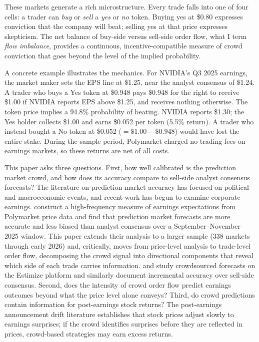 \documentclass[11pt]{article}
\begin{document}
These markets generate a rich microstructure. Every trade falls into one of four cells: a trader can \textit{buy} or \textit{sell} a \textit{yes} or \textit{no} token. Buying yes at \$0.80 expresses conviction that the company will beat; selling yes at that price expresses skepticism. The net balance of buy-side versus sell-side order flow, what I term \textit{flow imbalance}, provides a continuous, incentive-compatible measure of crowd conviction that goes beyond the level of the implied probability.

A concrete example illustrates the mechanics. For NVIDIA's Q3 2025 earnings, the market maker sets the EPS line at \$1.25, near the analyst consensus of \$1.24. A trader who buys a Yes token at \$0.948 pays \$0.948 for the right to receive \$1.00 if NVIDIA reports EPS above \$1.25, and receives nothing otherwise. The token price implies a 94.8\% probability of beating. NVIDIA reports \$1.30; the Yes holder collects \$1.00 and earns \$0.052 per token (5.5\% return). A trader who instead bought a No token at \$0.052 ($= \$1.00 - \$0.948$) would have lost the entire stake. During the sample period, Polymarket charged no trading fees on earnings markets, so these returns are net of all costs.

This paper asks three questions. First, how well calibrated is the prediction market crowd, and how does its accuracy compare to sell-side analyst consensus forecasts? The literature on prediction market accuracy \citep{wolfers2004prediction, page2012prediction} has focused on political and macroeconomic events, and recent work has begun to examine corporate earnings. \citet{gomezcram2025financial} construct a high-frequency measure of earnings expectations from Polymarket price data and find that prediction market forecasts are more accurate and less biased than analyst consensus over a September--November 2025 window. This paper extends their analysis to a larger sample (338 markets through early 2026) and, critically, moves from price-level analysis to trade-level order flow, decomposing the crowd signal into directional components that reveal which side of each trade carries information. \citet{jame2016value} and \citet{schafhautle2024crowdsourced} study crowdsourced forecasts on the Estimize platform and similarly document incremental accuracy over sell-side consensus. Second, does the intensity of crowd order flow predict earnings outcomes beyond what the price level alone conveys? Third, do crowd predictions contain information for post-earnings stock returns? The post-earnings announcement drift literature \citep{ball1968empirical, bernard1989post} establishes that stock prices adjust slowly to earnings surprises; if the crowd identifies surprises before they are reflected in prices, crowd-based strategies may earn excess returns.
\end{document}

